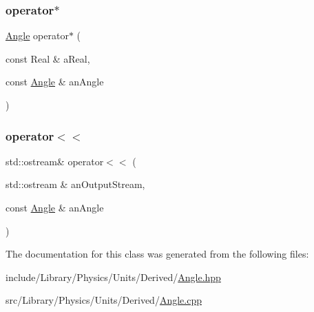 \subsubsection{\texorpdfstring{operator$\ast$}{operator*}}
{\footnotesize\ttfamily \hyperlink{classlibrary_1_1physics_1_1units_1_1_angle}{Angle} operator$\ast$ (\begin{DoxyParamCaption}\item[{const Real \&}]{a\+Real,  }\item[{const \hyperlink{classlibrary_1_1physics_1_1units_1_1_angle}{Angle} \&}]{an\+Angle }\end{DoxyParamCaption})\hspace{0.3cm}{\ttfamily [friend]}}

\mbox{\label{classlibrary_1_1physics_1_1units_1_1_angle_a0846b77ee3281e8a559197c3c3208eed}} 
\subsubsection{\texorpdfstring{operator$<$$<$}{operator<<}}
{\footnotesize\ttfamily std\+::ostream\& operator$<$$<$ (\begin{DoxyParamCaption}\item[{std\+::ostream \&}]{an\+Output\+Stream,  }\item[{const \hyperlink{classlibrary_1_1physics_1_1units_1_1_angle}{Angle} \&}]{an\+Angle }\end{DoxyParamCaption})\hspace{0.3cm}{\ttfamily [friend]}}



The documentation for this class was generated from the following files\+:\begin{DoxyCompactItemize}
\item 
include/\+Library/\+Physics/\+Units/\+Derived/\hyperlink{_angle_8hpp}{Angle.\+hpp}\item 
src/\+Library/\+Physics/\+Units/\+Derived/\hyperlink{_angle_8cpp}{Angle.\+cpp}\end{DoxyCompactItemize}
